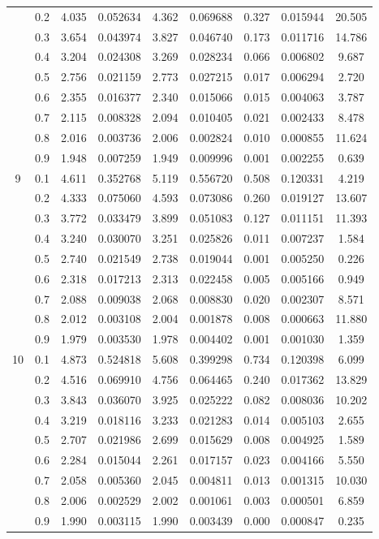 \begin{longtable}{ | c | c || c | c | c | c | c | c | c | }
 & 0.2 & 4.035 & 0.052634 & 4.362 & 0.069688 & 0.327 & 0.015944 & 20.505 \\
 & 0.3 & 3.654 & 0.043974 & 3.827 & 0.046740 & 0.173 & 0.011716 & 14.786 \\
 & 0.4 & 3.204 & 0.024308 & 3.269 & 0.028234 & 0.066 & 0.006802 & 9.687 \\
 & 0.5 & 2.756 & 0.021159 & 2.773 & 0.027215 & 0.017 & 0.006294 & 2.720 \\
 & 0.6 & 2.355 & 0.016377 & 2.340 & 0.015066 & 0.015 & 0.004063 & 3.787 \\
 & 0.7 & 2.115 & 0.008328 & 2.094 & 0.010405 & 0.021 & 0.002433 & 8.478 \\
 & 0.8 & 2.016 & 0.003736 & 2.006 & 0.002824 & 0.010 & 0.000855 & 11.624 \\
 & 0.9 & 1.948 & 0.007259 & 1.949 & 0.009996 & 0.001 & 0.002255 & 0.639 \\
 \hline
\multirow{9}{*}{9} & 0.1 & 4.611 & 0.352768 & 5.119 & 0.556720 & 0.508 & 0.120331 & 4.219 \\
 & 0.2 & 4.333 & 0.075060 & 4.593 & 0.073086 & 0.260 & 0.019127 & 13.607 \\
 & 0.3 & 3.772 & 0.033479 & 3.899 & 0.051083 & 0.127 & 0.011151 & 11.393 \\
 & 0.4 & 3.240 & 0.030070 & 3.251 & 0.025826 & 0.011 & 0.007237 & 1.584 \\
 & 0.5 & 2.740 & 0.021549 & 2.738 & 0.019044 & 0.001 & 0.005250 & 0.226 \\
 & 0.6 & 2.318 & 0.017213 & 2.313 & 0.022458 & 0.005 & 0.005166 & 0.949 \\
 & 0.7 & 2.088 & 0.009038 & 2.068 & 0.008830 & 0.020 & 0.002307 & 8.571 \\
 & 0.8 & 2.012 & 0.003108 & 2.004 & 0.001878 & 0.008 & 0.000663 & 11.880 \\
 & 0.9 & 1.979 & 0.003530 & 1.978 & 0.004402 & 0.001 & 0.001030 & 1.359 \\
 \hline
\multirow{9}{*}{10} & 0.1 & 4.873 & 0.524818 & 5.608 & 0.399298 & 0.734 & 0.120398 & 6.099 \\
 & 0.2 & 4.516 & 0.069910 & 4.756 & 0.064465 & 0.240 & 0.017362 & 13.829 \\
 & 0.3 & 3.843 & 0.036070 & 3.925 & 0.025222 & 0.082 & 0.008036 & 10.202 \\
 & 0.4 & 3.219 & 0.018116 & 3.233 & 0.021283 & 0.014 & 0.005103 & 2.655 \\
 & 0.5 & 2.707 & 0.021986 & 2.699 & 0.015629 & 0.008 & 0.004925 & 1.589 \\
 & 0.6 & 2.284 & 0.015044 & 2.261 & 0.017157 & 0.023 & 0.004166 & 5.550 \\
 & 0.7 & 2.058 & 0.005360 & 2.045 & 0.004811 & 0.013 & 0.001315 & 10.030 \\
 & 0.8 & 2.006 & 0.002529 & 2.002 & 0.001061 & 0.003 & 0.000501 & 6.859 \\
 & 0.9 & 1.990 & 0.003115 & 1.990 & 0.003439 & 0.000 & 0.000847 & 0.235 \\
 \hline
\hline
\end{longtable}
 
